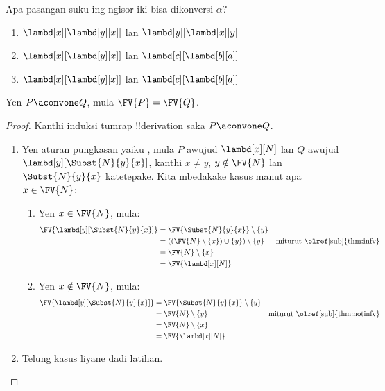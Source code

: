 \documentclass[../../../include/open-logic-section]{subfiles}
\begin{document}
\begin{prob}
  Apa pasangan suku ing ngisor iki
  bisa dikonversi-$\alpha$?
  \begin{enumerate}
  \item $\lambd[x][\lambd[y][x]]$ lan $\lambd[y][\lambd[x][y]]$
  \item $\lambd[x][\lambd[y][x]]$ lan $\lambd[c][\lambd[b][a]]$
  \item $\lambd[x][\lambd[y][x]]$ lan $\lambd[c][\lambd[b][a]]$
  \end{enumerate}
\end{prob}

\begin{lem}
  Yen $P \aconvone Q$, mula
  $\FV{P} = \FV{Q}$.
\end{lem}

\begin{proof}
  Kanthi induksi tumrap !!{derivation}
  saka $P \aconvone Q$.
  \begin{enumerate}
  \item Yen aturan pungkasan yaiku
    , mula
    $P$ awujud $\lambd[x][N]$
    lan $Q$ awujud
    $\lambd[y][\Subst{N}{y}{x}]$,
    kanthi $x \neq y$,
    $y \notin \FV{N}$ lan
    $\Subst{N}{y}{x}$ katetepake.
    Kita mbedakake kasus manut
    apa $x \in \FV{N}$:
    \begin{enumerate}
    \item Yen $x \in \FV{N}$, mula:
      \begin{align*}
        \FV{\lambd[y][\Subst{N}{y}{x}]} &=
        \FV{\Subst{N}{y}{x}} \setminus \{y\} \\
        & = ((\FV{N} \setminus \{x\}) \cup \{y\}) \setminus \{y\}
         && \text{miturut \olref[sub]{thm:infv}} \\
        & = \FV{N} \setminus \{x\} \\
        & = \FV{\lambd[x][N]}
      \end{align*}
    \item Yen $x \notin \FV{N}$, mula:
      \begin{align*}
        \FV{\lambd[y][\Subst{N}{y}{x}]}
        & = \FV{\Subst{N}{y}{x}} \setminus \{y\} \\
        & = \FV{N} \setminus \{y\}
         && \text{miturut \olref[sub]{thm:notinfv}} \\
        & = \FV{N} \setminus \{x\} \\
        & = \FV{\lambd[x][N]}.
      \end{align*}
    \end{enumerate}
  \item Telung kasus liyane dadi latihan.
  \end{enumerate}
\end{proof}
\end{document}
